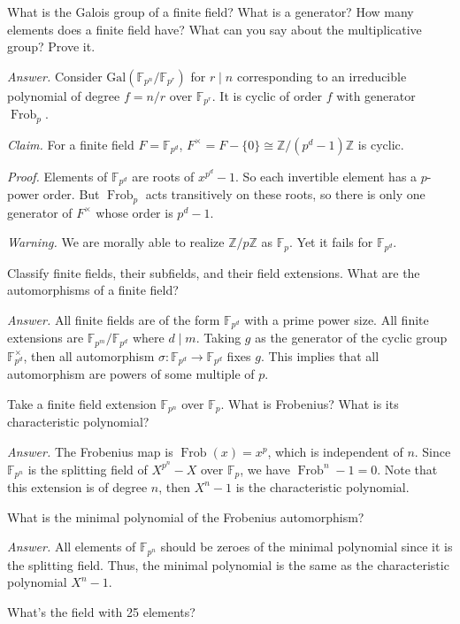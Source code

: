 \documentclass{mathproblems}
\newcommand\F{\mathbb{F}}
\newcommand\Z{\mathbb{Z}}
\newcommand\Gal{\mathrm{Gal}}
\begin{document}
\begin{questions}
\miquestion
{\color{blue} What is the Galois group of a finite field? What is a generator? How many elements does a finite field have? What can you say about the multiplicative group? Prove it.}

\textit{Answer.}
Consider $\Gal(\F_{p^n}/\F_{p^r})$ for $r\mid n$ corresponding to an irreducible polynomial of degree $f=n/r$ over $\F_{p^r}$. It is cyclic of order $f$ with generator $\operatorname{Frob}_{p}$.

\textit{Claim.}
For a finite field $F=\F_{p^d}$, $F^\times=F-\{0\}\cong \Z/(p^d-1) \Z$ is cyclic.

\textit{Proof.}
Elements of $\F_{p^d}$ are roots of $x^{p^d}-1$. So each invertible element has a $p$-power order. But $\operatorname{Frob}_p$ acts transitively on these roots, so there is only one generator of $F^\times$ whose order is $p^d-1$.

{\color{red} \textit{Warning.} We are morally able to realize $\Z/p\Z$ as $\F_{p}$. Yet it fails for $\F_{p^d}$.}

\miquestion
{\color{blue} Classify finite fields, their subfields, and their field extensions. What are the automorphisms of a finite field?}

\textit{Answer.}
All finite fields are of the form $\F_{p^d}$ with a prime power size. All finite extensions are $\F_{p^m}/\F_{p^d}$ where $d\mid m$. Taking $g$ as the generator of the cyclic group $\F_{p^d}^\times$, then all automorphism $\sigma: \F_{p^d}\to \F_{p^d}$ fixes $g$. This implies that all automorphism are powers of some multiple of $p$.

\miquestion
{\color{blue} Take a finite field extension $\F_{p^{n}}$ over $\F_{p}$. What is Frobenius? What is its characteristic polynomial?}

\textit{Answer.}
The Frobenius map is $\operatorname{Frob}(x)=x^p$, which is independent of $n$. Since $\F_{p^n}$ is the splitting field of $X^{p^n}-X$ over $\F_p$, we have $\operatorname{Frob}^n-1=0$. Note that this extension is of degree $n$, then $X^n-1$ is the characteristic polynomial.

\miquestion
{\color{blue} What is the minimal polynomial of the Frobenius automorphism?}

\textit{Answer.}
All elements of $\F_{p^n}$ should be zeroes of the minimal polynomial since it is the splitting field. Thus, the minimal polynomial is the same as the characteristic polynomial $X^n-1$.

\miquestion
{\color{blue} What's the field with 25 elements?}


\end{questions}
\end{document}
